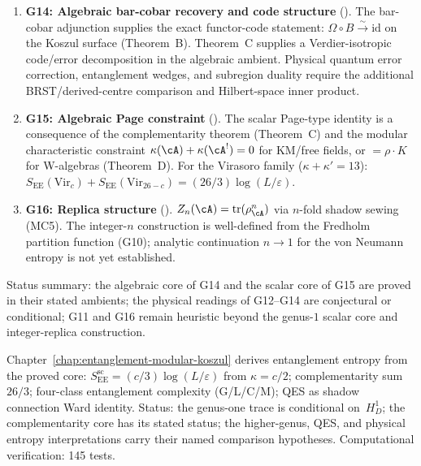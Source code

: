 \begin{remark}
\begin{enumerate}[label=\textup{(\alph*)}]
\item \textbf{G14: Algebraic bar-cobar recovery and code structure}
 (\ClaimStatusConditional).
 The bar-cobar adjunction supplies the exact functor-code statement:
 $\Omega \circ B \xrightarrow{\sim} \mathrm{id}$ on the Koszul surface
 (Theorem~B). Theorem~C supplies a Verdier-isotropic code/error
 decomposition in the algebraic ambient. Physical quantum error
 correction, entanglement wedges, and subregion duality require the
 additional BRST/derived-centre comparison and Hilbert-space inner
 product.

\item \textbf{G15: Algebraic Page constraint}
 (\ClaimStatusProvedHere).
The scalar Page-type identity is a consequence of the complementarity
theorem (Theorem~C) and the modular characteristic constraint
$\kappa(\cA) + \kappa(\cA^!) = 0$ for KM/free fields,
or $= \rho \cdot K$ for W-algebras (Theorem~D).
 For the Virasoro family ($\kappa + \kappa' = 13$):
 $S_{\mathrm{EE}}(\mathrm{Vir}_c)
 + S_{\mathrm{EE}}(\mathrm{Vir}_{26-c})
 = (26/3)\log(L/\varepsilon)$.

\item \textbf{G16: Replica structure}
 (\ClaimStatusHeuristic).
 $Z_n(\cA) = \operatorname{tr}(\rho_\cA^n)$ via $n$-fold shadow
 sewing (MC5). The integer-$n$ construction is well-defined from the
 Fredholm partition function (G10); analytic continuation
 $n \to 1$ for the von Neumann entropy is not yet established.
\end{enumerate}
\noindent
Status summary: the algebraic core of G14 and the scalar core of G15
are proved in their stated ambients; the physical readings of G12--G14
are conjectural or conditional; G11 and G16 remain heuristic beyond the
genus-$1$ scalar core and integer-replica construction.
\end{remark}

\begin{remark}
\label{rem:concordance-g11-entanglement}
Chapter~\ref{chap:entanglement-modular-koszul} derives
entanglement entropy from the proved core:
$S_{\mathrm{EE}}^{\mathrm{sc}} = (c/3)\log(L/\varepsilon)$
from $\kappa = c/2$; complementarity sum $26/3$;
four-class entanglement complexity (G/L/C/M);
QES as shadow connection Ward identity.
Status: the genus-one trace is conditional on~$H_D^1$; the
complementarity core has its stated status; the higher-genus, QES, and
physical entropy interpretations carry their named comparison
hypotheses.
Computational verification: 145 tests.
\end{remark}

